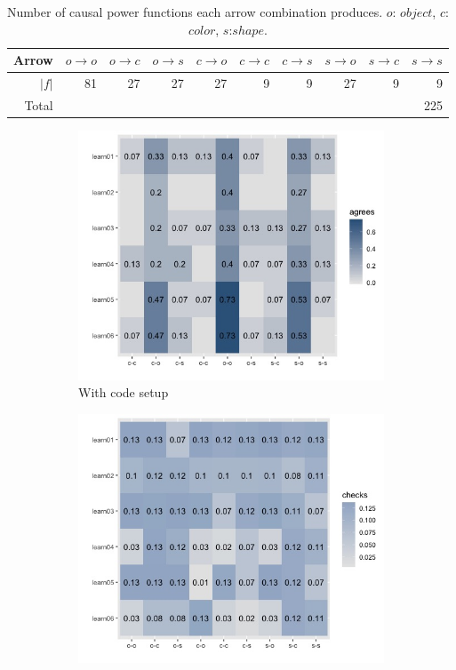 \documentclass{article}
\begin{document}
\begin{table}
  \centering
  \begin{tabular}{rrrrrrrrrr}
    Arrow & $o \rightarrow o$ & $o \rightarrow c$ & $o \rightarrow s$ & $c \rightarrow o$ & $c \rightarrow c$ & $c \rightarrow s$ & $s \rightarrow o$ & $s \rightarrow c$ & $s \rightarrow s$ \\
    \hline \hline
    $|f|$ & 81  & 27  & 27  & 27  & 9   & 9   & 27  & 9   & 9   \\
    \hline
    Total &     &     &     &     &     &     &     &     & 225
  \end{tabular}
  \caption{Number of causal power functions each arrow combination produces. $o$: $object$, $c$: $color$, $s$:$shape$.}
  \label{functions}
\end{table}

\begin{figure}[h!]
  \centering
  \begin{subfigure}[t]{0.45\textwidth}
    \centering
    \includegraphics[width=\linewidth]{th_norm} 
    \caption{With code setup}
  \end{subfigure}
  \hfill
  \begin{subfigure}[t]{0.45\textwidth}
    \centering
    \includegraphics[width=\linewidth]{th_ppt} 

\end{subfigure}
\end{figure}
\end{document}
